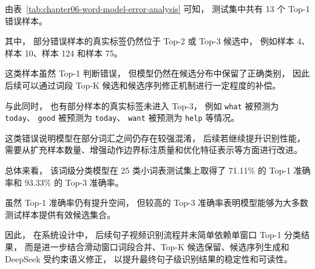 由表~\ref{tab:chapter06-word-model-error-analysis} 可知，
测试集中共有 13 个 Top-1 错误样本。

其中，
部分错误样本的真实标签仍然位于 Top-2 或 Top-3 候选中，
例如样本 4、样本 10、样本 124 和样本 75。

这类样本虽然 Top-1 判断错误，
但模型仍然在候选分布中保留了正确类别，
因此后续可以通过词段 Top-K 候选和候选序列修正机制进行一定程度的补偿。

与此同时，
也有部分样本的真实标签未进入 Top-3，
例如 \texttt{what} 被预测为 \texttt{today}、
\texttt{good} 被预测为 \texttt{today}、
\texttt{want} 被预测为 \texttt{help} 等情况。

这类错误说明模型在部分词汇之间仍存在较强混淆，
后续若继续提升识别性能，
需要从扩充样本数量、增强动作边界标注质量和优化特征表示等方面进行改进。

总体来看，
该词级分类模型在 25 类小词表测试集上取得了 71.11\% 的 Top-1 准确率和 93.33\% 的 Top-3 准确率。

虽然 Top-1 准确率仍有提升空间，
但较高的 Top-3 准确率表明模型能够为大多数测试样本提供有效候选集合。

因此，
在系统设计中，
后续句子视频识别流程并未简单依赖单窗口 Top-1 分类结果，
而是进一步结合滑动窗口词段合并、Top-K 候选保留、候选序列生成和 DeepSeek 受约束语义修正，
以提升最终句子级识别结果的稳定性和可读性。